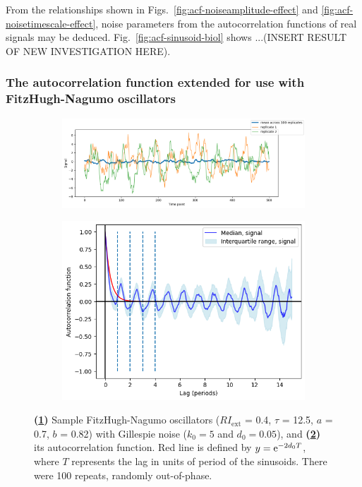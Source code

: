 From the relationships shown in Figs.\ \ref{fig:acf-noiseamplitude-effect} and \ref{fig:acf-noisetimescale-effect}, noise parameters from the autocorrelation functions of real signals may be deduced.
Fig.\ \ref{fig:acf-sinusoid-biol} shows ...(INSERT RESULT OF NEW INVESTIGATION HERE).


\subsubsection{The autocorrelation function extended for use with FitzHugh-Nagumo oscillators}
\label{subsubsec:analysis-characterisation-acf-fhn}


\begin{figure}
  \centering
  \begin{subfigure}[t]{0.6\textwidth}
  \centering
    \includegraphics[width=\linewidth]{fhn_meanplot}
    \caption{
    }
    \label{fig:acf-fhn-gillnoise-ts}
  \end{subfigure}%
  \begin{subfigure}[t]{0.4\textwidth}
  \centering
    \includegraphics[width=\linewidth]{fhn_acf}
    \caption{
    }
    \label{fig:acf-fhn-gillnoise-acf}
  \end{subfigure}

  \caption{
    \textbf{(\ref{fig:acf-fhn-gillnoise-ts})} Sample FitzHugh-Nagumo oscillators ($RI_{\mathrm{ext}}$ = 0.4, $\tau$ = 12.5, $a$ = 0.7, $b$ = 0.82) with Gillespie noise ($k_{0} = 5$ and $d_{0} = 0.05$), and 
    \textbf{(\ref{fig:acf-fhn-gillnoise-acf})} its autocorrelation function.
    Red line is defined by $y = \mathrm{e}^{-2d_{0}T}$, where $T$ represents the lag in units of period of the sinusoids.
    There were 100 repeats, randomly out-of-phase.
  }
  \label{fig:acf-fhn}
\end{figure}


